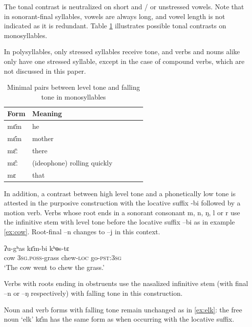 \documentclass[oldfontcommands,oneside,a4paper,11pt]{article}
\newcommand{\ipa}[1]{{\phon \mbox{#1}}} %
\begin{document}
 The tonal contrast is neutralized  on short  and / or unstressed vowels. Note that in sonorant-final syllables, vowels are always long, and vowel length is not indicated as it is redundant. Table \ref{tab:minimal.pairs} illustrates possible tonal contrasts on monosyllables.  

In polysyllables, only stressed syllables receive tone, and verbs and nouns alike only have one stressed syllable, except in the case of compound verbs, which are not discussed in this paper.

\begin{table}[h]
\caption{Minimal pairs between level tone and falling tone in monosyllables } \label{tab:minimal.pairs}\centering
\begin{tabular}{llllll}
\toprule
Form & Meaning\\
\midrule
\ipa{mɛ̄m} & he \\
\ipa{mɛ̂m} & mother\\
\midrule
\ipa{mɛ̄ː} & there\\
\ipa{mɛ̂ː} & (ideophone) rolling quickly \\
\ipa{mɛ} & that\\
\bottomrule
\end{tabular}
\end{table}

In addition, a contrast between high level tone and a phonetically low tone is attested in the purposive construction with the locative suffix \ipa{-bi} followed by a motion verb. Verbs  whose root ends in a sonorant consonant \ipa{m}, \ipa{n}, \ipa{ŋ}, \ipa{l} or \ipa{r} use the infinitive stem with level tone before the locative suffix \ipa{--bi} as in example \ref{ex:cow}. Root-final   \ipa{--n} changes to \ipa{--j} in this context. 

\begin{exe}
\ex \label{ex:cow}
\gll \ipa{bʌ̂j} \ipa{ʔu-gʰas} \ipa{kɛ̄m-bi} \ipa{kʰɵs-tɛ}  \\
cow \textsc{3sg.poss}-grass chew-\textsc{loc} go-\textsc{pst:3sg} \\
\glt `The cow went to chew the grass.'
\end{exe}

Verbs with roots ending in obstruents use the nasalized infinitive stem (with final \ipa{--n} or \ipa{--ŋ} respectively) with falling tone in this construction.

Noun  and verb forms with falling tone  remain unchanged as in \ref{ex:elk}: the free noun `elk' \ipa{kɛ̂m} has the same form as when occurring with the locative suffix.
\end{document}
